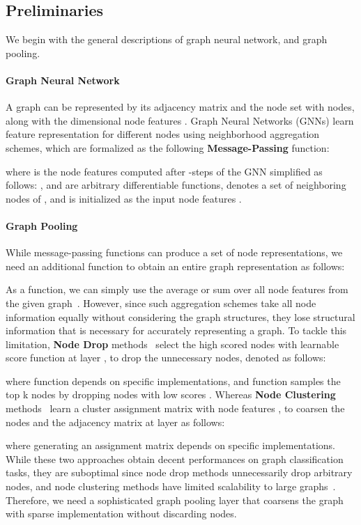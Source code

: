 \documentclass{article} \usepackage{iclr2021_conference,times}
\begin{document}
\subsection{Preliminaries}
We begin with the general descriptions of graph neural network, and graph pooling.

\paragraph{Graph Neural Network}
A graph  can be represented by its adjacency matrix  and the node set  with  nodes, along with the  dimensional node features . Graph Neural Networks (GNNs) learn feature representation for different nodes using neighborhood aggregation schemes, which are formalized as the following \textbf{Message-Passing} function:

where  is the node features computed after -steps of the GNN simplified as follows: ,  and  are arbitrary differentiable functions,  denotes a set of neighboring nodes of , and  is initialized as the input node features .

\paragraph{Graph Pooling}
While message-passing functions can produce a set of node representations, we need an additional  function to obtain an entire graph representation  as follows:

As a  function, we can simply use the average or sum over all node features  from the given graph~\citep{avg/pooling/1, GIN}. However, since such aggregation schemes take all node information equally without considering the graph structures, they lose structural information that is necessary for accurately representing a graph. To tackle this limitation, \textbf{Node Drop} methods~\citep{TopKPool, SAGPool} select the high scored nodes  with learnable score function  at layer , to drop the unnecessary nodes, denoted as follows:

where function  depends on specific implementations, and  function samples the top k nodes by dropping nodes with low scores . Whereas \textbf{Node Clustering} methods~\citep{DiffPool, MincutPool} learn a cluster assignment matrix  with node features , to coarsen the nodes and the adjacency matrix  at layer  as follows:

where generating an assignment matrix  depends on specific implementations. While these two approaches obtain decent performances on graph classification tasks, they are suboptimal since node drop methods unnecessarily drop arbitrary nodes, and node clustering methods have limited scalability to large graphs~\citep{GNN/sparse/pooling:Readout, SAGPool}. Therefore, we need a sophisticated graph pooling layer that coarsens the graph with sparse implementation without discarding nodes.
\end{document}

